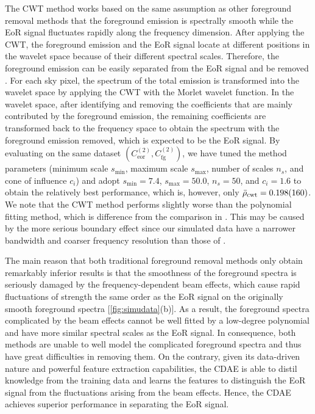 \documentclass[fleqn,usenatbib]{mnras}
\newcommand{\R}[1]{\mathrm{#1}}
\newcommand{\editone}[1]{{\leavevmode\color{cyan}#1}}
\begin{document}
\editone{%
The CWT method works based on the same assumption as other foreground
removal methods that the foreground emission is spectrally smooth while the
EoR signal fluctuates rapidly along the frequency dimension.
After applying the CWT, the foreground emission and the EoR signal locate
at different positions in the wavelet space because of their different
spectral scales.
Therefore, the foreground emission can be easily separated from the EoR
signal and be removed \citep{gu2013}.
For each sky pixel, the spectrum of the total emission is transformed into
the wavelet space by applying the CWT with the Morlet wavelet function.
In the wavelet space, after identifying and removing the coefficients that
are mainly contributed by the foreground emission, the remaining
coefficients are transformed back to the frequency space to obtain the
spectrum with the foreground emission removed, which is expected to be the
EoR signal.
By evaluating on the same dataset
$\left( C_{\R{eor}}^{(2)}, C_{\R{fg}}^{(2)} \right)$,
we have tuned the method parameters (minimum scale $s_{\R{min}}$, maximum
scale $s_{\R{max}}$, number of scales $n_s$, and cone of influence $c_i$)
and adopt $s_{\R{min}} = 7.4$, $s_{\R{max}} = 50.0$, $n_s = 50$, and
$c_i = 1.6$ to obtain the relatively best performance, which is, however,
only $\bar{\rho}_{\R{cwt}} = \num{0.198 +- 0.160}$.
We note that the CWT method performs slightly worse than the polynomial
fitting method, which is difference from the comparison in \citet{gu2013}.
This may be caused by the more serious boundary effect since our simulated
data have a narrower bandwidth and coarser frequency resolution than those
of \citet{gu2013}.

The main reason that both traditional foreground removal methods only
obtain remarkably inferior results is that the smoothness of the foreground
spectra is seriously damaged by the frequency-dependent beam effects, which
cause rapid fluctuations of strength the same order as the EoR signal on
the originally smooth foreground spectra [\autoref{fig:simudata}(b)].
As a result, the foreground spectra complicated by the beam effects cannot
be well fitted by a low-degree polynomial and have more similar spectral
scales as the EoR signal.
In consequence, both methods are unable to well model the complicated
foreground spectra and thus have great difficulties in removing them.
On the contrary, given its data-driven nature and powerful feature
extraction capabilities, the CDAE is able to distil knowledge from the
training data and learns the features to distinguish the EoR signal from
the fluctuations arising from the beam effects.
Hence, the CDAE achieves superior performance in separating the EoR signal.
} %
\end{document}
